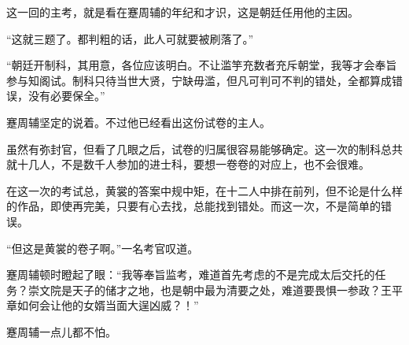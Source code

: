 这一回的主考，就是看在蹇周辅的年纪和才识，这是朝廷任用他的主因。

“这就三题了。都判粗的话，此人可就要被刷落了。”

“朝廷开制科，其用意，各位应该明白。不让滥竽充数者充斥朝堂，我等才会奉旨参与知阁试。制科只待当世大贤，宁缺毋滥，但凡可判可不判的错处，全都算成错误，没有必要保全。”

蹇周辅坚定的说着。不过他已经看出这份试卷的主人。

虽然有弥封官，但看了几眼之后，试卷的归属很容易能够确定。这一次的制科总共就十几人，不是数千人参加的进士科，要想一卷卷的对应上，也不会很难。

在这一次的考试总，黄裳的答案中规中矩，在十二人中排在前列，但不论是什么样的作品，即使再完美，只要有心去找，总能找到错处。而这一次，不是简单的错误。

“但这是黄裳的卷子啊。”一名考官叹道。

蹇周辅顿时瞪起了眼：“我等奉旨监考，难道首先考虑的不是完成太后交托的任务？崇文院是天子的储才之地，也是朝中最为清要之处，难道要畏惧一参政？王平章如何会让他的女婿当面大逞凶威？！”

蹇周辅一点儿都不怕。
